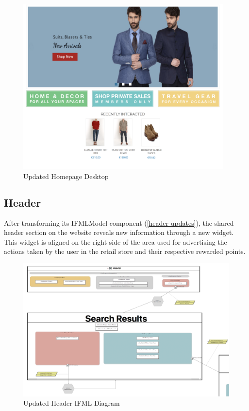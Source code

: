 \begin{figure}[H]
  \centering
    \includegraphics[height=9cm]{images/diagrams/after/desktop-homepage.png}
  \caption{Updated Homepage Desktop}
  \label{fig:desktop-before-homepage}
\end{figure}
\vspace{0.5cm}

\newpage
\subsection{Header}

After transforming its IFMLModel component (\ref{header-updates}), the shared header section on the website reveals new information through a new widget. This widget is aligned on the right side of the area used for advertising the actions taken by the user in the retail store and their respective rewarded points.

\vspace{0.5cm}
\begin{figure}[H]
  \centering
    \includegraphics[width=14cm]{images/diagrams/after/ifml-header.png}
  \caption{Updated Header IFML Diagram}
  \label{fig:ifml-after-homepage}
\end{figure}

